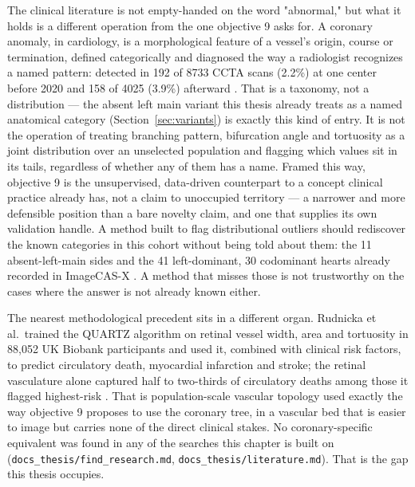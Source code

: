 The clinical literature is not empty-handed on the word "abnormal," but what it holds is a different
operation from the one objective 9 asks for.
A coronary anomaly, in cardiology, is a morphological feature of a vessel's origin, course or
termination, defined categorically and diagnosed the way a radiologist recognizes a named pattern:
detected in 192 of 8733 CCTA scans (2.2\%) at one center before 2020 and 158 of 4025 (3.9\%)
afterward \cite{zamfir2024anomalies}.
That is a taxonomy, not a distribution --- the absent left main variant this thesis already treats as
a named anatomical category (Section~\ref{sec:variants}) is exactly this kind of entry.
It is not the operation of treating branching pattern, bifurcation angle and tortuosity as a joint
distribution over an unselected population and flagging which values sit in its tails, regardless of
whether any of them has a name.
Framed this way, objective 9 is the unsupervised, data-driven counterpart to a concept clinical
practice already has, not a claim to unoccupied territory --- a narrower and more defensible position
than a bare novelty claim, and one that supplies its own validation handle.
A method built to flag distributional outliers should rediscover the known categories in this cohort
without being told about them: the 11 absent-left-main sides and the 41 left-dominant, 30 codominant
hearts already recorded in ImageCAS-X \cite{bransby2026imagecasx}.
A method that misses those is not trustworthy on the cases where the answer is not already known
either.

The nearest methodological precedent sits in a different organ.
Rudnicka et al.\ trained the QUARTZ algorithm on retinal vessel width, area and tortuosity in 88{,}052
UK Biobank participants and used it, combined with clinical risk factors, to predict circulatory
death, myocardial infarction and stroke; the retinal vasculature alone captured half to two-thirds of
circulatory deaths among those it flagged highest-risk \cite{rudnicka2022quartz}.
That is population-scale vascular topology used exactly the way objective 9 proposes to use the
coronary tree, in a vascular bed that is easier to image but carries none of the direct clinical
stakes.
No coronary-specific equivalent was found in any of the searches this chapter is built on
(\texttt{docs\_thesis/find\_research.md}, \texttt{docs\_thesis/literature.md}).
That is the gap this thesis occupies.
